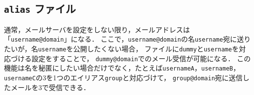 \subsection{\texttt{\bfseries alias} ファイル}
通常，メールサーバを設定をしない限り，メールアドレスは「\texttt{username@domain}」になる．
ここで，\texttt{username@domain}の名\texttt{username}宛に送りたいが，\user 名\texttt{username}を公開したくない場合，
\alias ファイルに\texttt{dummy}と\texttt{username}を対応づける設定をすることで，
\texttt{dummy@domain}でのメール受信が可能になる．
この機能は\user 名を秘匿にしたい場合だけでなく，たとえば\texttt{usernameA}，\texttt{usernameB}，\texttt{usernameC}の3\user を1つのエイリアス\texttt{group}と対応づけて，
\texttt{group@domain}宛に送信したメールを3\user で受信できる．
